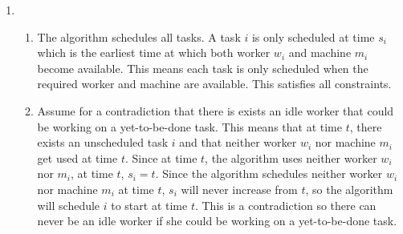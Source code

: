 \documentclass{article}
\begin{document}
\begin{enumerate}
    \newpage
    
    \item 
    \begin{enumerate}
        \item The algorithm schedules all tasks. A task $i$ is only scheduled at time $s_i$ which is the earliest time at which both worker $w_i$ and machine $m_i$ become available. This means each task is only scheduled when the required worker and machine are available. This satisfies all constraints.
        
        \item Assume for a contradiction that there is exists an idle worker that could be working on a yet-to-be-done task. This means that at time $t$, there exists an unscheduled task $i$ and that neither worker $w_i$ nor machine $m_i$ get used at time $t$. Since at time $t$, the algorithm uses neither worker $w_i$ nor $m_i$, at time $t$, $s_{i}= t$. Since the algorithm schedules neither worker $w_i$ nor  machine $m_i$ at time $t$, $s_i$ will never increase from $t$, so the algorithm will schedule $i$ to start at time $t$. This is a contradiction so there can never be an idle worker if she could be working on a yet-to-be-done task.
        

\end{enumerate}
\end{enumerate}
\end{document}
